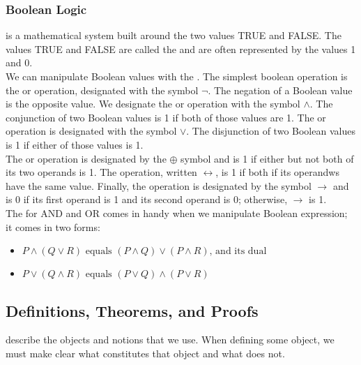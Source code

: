 \documentclass{article}
\begin{document}
\subsubsection{Boolean Logic}

 is a mathematical system built around the two values TRUE and FALSE. The values TRUE and FALSE are called the  and are often represented by the values 1 and 0. \\ 

  We can manipulate Boolean values with the . The simplest boolean operation is the  or  operation, designated with the symbol $\neg$. The negation of a Boolean value is the opposite value. We designate the  or  operation with the symbol $\land$. The conjunction of two Boolean values is 1 if both of those values are 1. The  or  operation is designated with the symbol $\lor$. The disjunction of two Boolean values is 1 if either of those values is 1. \\ 

  The  or  operation is designated by the $\oplus$ symbol and is 1 if either but not both of its two operands is 1. The  operation, written $\leftrightarrow$, is 1 if both if its operandws have the same value. Finally, the  operation is designated by the symbol $\rightarrow$ and is 0 if its first operand is 1 and its second operand is 0; otherwise, $\rightarrow$ is 1. \\ 

The  for AND and OR comes in handy when we manipulate Boolean expression; it comes in two forms: 

\begin{itemize}
  \item $P \land (Q \lor R) \textrm{ equals } (P \land Q) \lor (P \land R) \textrm{, and its dual}$
  \item $P \lor (Q \land R) \textrm{ equals } (P \lor Q) \land (P \lor R)$
\end{itemize}

\subsection{Definitions, Theorems, and Proofs}

 describe the objects and notions that we use. When defining some object, we must make clear what constitutes that object and what does not. \\
\end{document}
